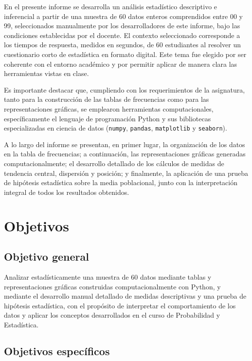 \documentclass[12pt,letterpaper]{article}
\begin{document}
En el presente informe se desarrolla un análisis estadístico descriptivo e inferencial
a partir de una muestra de 60 datos enteros comprendidos entre 00 y 99, seleccionados
manualmente por los desarrolladores de este informe, bajo las condiciones establecidas por el docente. El contexto seleccionado corresponde a los tiempos de respuesta, medidos en segundos, de 60 estudiantes al resolver un cuestionario corto de estadística en formato digital. Este tema fue elegido por ser coherente con el entorno académico y por permitir aplicar de manera clara las herramientas vistas en clase.

Es importante destacar que, cumpliendo con los requerimientos de la asignatura, tanto para la construcción de las tablas de frecuencias como para las
representaciones gráficas, se emplearon herramientas computacionales, específicamente el lenguaje de programación Python y sus bibliotecas especializadas en ciencia de datos (\texttt{numpy}, \texttt{pandas}, \texttt{matplotlib} y \texttt{seaborn}).

A lo largo del informe se presentan, en primer lugar, la organización de los datos
en la tabla de frecuencias; a continuación, las representaciones gráficas generadas
computacionalmente; el desarrollo detallado de los cálculos de medidas de tendencia
central, dispersión y posición; y finalmente, la aplicación de una prueba de hipótesis
estadística sobre la media poblacional, junto con la interpretación integral de todos
los resultados obtenidos.

\section{Objetivos}

\subsection{Objetivo general}

Analizar estadísticamente una muestra de 60 datos mediante tablas y
representaciones gráficas construidas computacionalmente con Python, y mediante
el desarrollo manual detallado de medidas descriptivas y una prueba de hipótesis
estadística, con el propósito de interpretar el comportamiento de los datos y
aplicar los conceptos desarrollados en el curso de Probabilidad y Estadística.

\subsection{Objetivos específicos}
\end{document}
